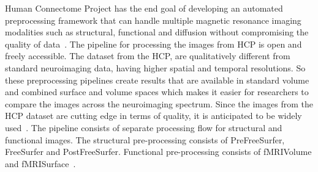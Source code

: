 
Human Connectome Project has the end goal of developing an automated preprocessing framework that can handle multiple magnetic resonance imaging modalities such as structural, functional and diffusion without compromising the quality of data~\cite{Gla13}. The pipeline for processing the images from HCP is open and freely accessible. The dataset from the HCP, are qualitatively different from standard neuroimaging data, having higher spatial and temporal resolutions. So these preprocessing pipelines create results that are available in standard volume and combined surface and volume spaces which makes it easier for researchers to compare the images across the neuroimaging spectrum. Since the images from the HCP dataset are cutting edge in terms of quality, it is anticipated to be widely used~\cite{HODGE20161102}. The pipeline consists of separate processing flow for structural and functional images. The structural pre-processing consists of PreFreeSurfer, FreeSurfer and PostFreeSurfer. Functional pre-processing consists of fMRIVolume and fMRISurface~\cite{FSL}.


